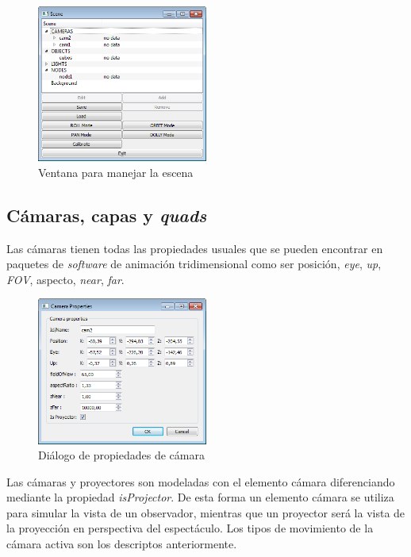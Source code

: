\begin{figure}[H]
  \centering
    \includegraphics[width=0.5\textwidth]{./Cap5_vmt/vmt_scene.png}
  \caption{Ventana para manejar la escena}
  \label{fig:VMT-SceneWindow}
\end{figure}

\subsection{Cámaras, capas y \emph{quads}}
Las cámaras tienen todas las propiedades usuales que se pueden encontrar en paquetes de \emph{software} de animación tridimensional como ser posición, \emph{eye}, \emph{up}, \emph{FOV}, aspecto, \emph{near}, \emph{far}.

\begin{figure}[H]
  \centering
    \includegraphics[width=0.5\textwidth]{./Cap5_vmt/vmt_cameraProperties.png}
  \caption{Diálogo de propiedades de cámara}
  \label{fig:VMT-CameraProperties}
\end{figure}

Las cámaras y proyectores son modeladas con el elemento cámara diferenciando mediante la propiedad \emph{isProjector}. De esta forma un elemento cámara se utiliza para simular la vista de un observador, mientras que un proyector será la vista de la proyección en perspectiva del espectáculo.
Los tipos de movimiento de la cámara activa son los descriptos anteriormente.

